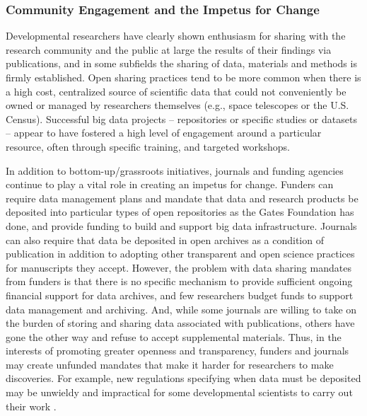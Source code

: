 \documentclass[letterpaper,man,apacite]{apa6}
\begin{document}
\subsubsection{Community Engagement and the Impetus for Change}

Developmental researchers have clearly shown enthusiasm for sharing with the research community and the public at large the results of their findings via publications, and in some subfields the sharing of data, materials and methods is firmly established.
Open sharing practices tend to be more common when there is a high cost, centralized source of scientific data that could not conveniently be owned or managed by researchers themselves (e.g., space telescopes or the U.S. Census).
Successful big data projects -- repositories or specific studies or datasets -- appear to have fostered a high level of engagement around a particular resource, often through specific training, and targeted workshops.

In addition to bottom-up/grassroots initiatives, journals and funding agencies continue to play a vital role in creating an impetus for change.
Funders can require data management plans and mandate that data and research products be deposited into particular types of open repositories as the Gates Foundation has done, and provide funding to build and support big data infrastructure.
Journals can also require that data be deposited in open archives as a condition of publication in addition to adopting other transparent and open science practices for manuscripts they accept.
However, the problem with data sharing mandates from funders is that there is no specific mechanism to provide sufficient ongoing financial support for data archives, and few researchers budget funds to support data management and archiving.
And, while some journals are willing to take on the burden of storing and sharing data associated with publications, others \cite{maunsell_announcement_2010} have gone the other way and refuse to accept supplemental materials.
Thus, in the interests of promoting greater openness and transparency, funders and journals may create unfunded mandates that make it harder for researchers to make discoveries.
For example, new regulations specifying when data must be deposited may be unwieldy and impractical for some developmental scientists to carry out their work \cite{eisenberg_thoughts_2015, apa_data_sharing_work_group_data_2015}.
\end{document}
